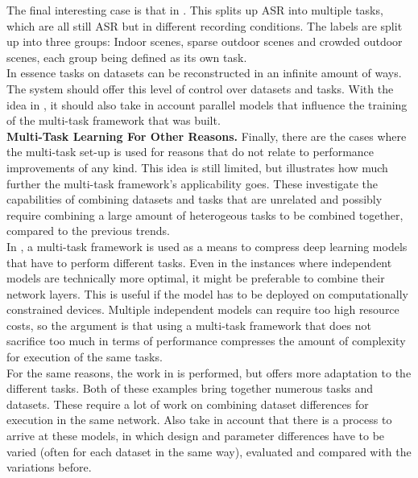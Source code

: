 The final interesting case is that in \cite{nwe2017convolutional}. This splits up ASR into multiple tasks, which are all still ASR but in different recording conditions. The labels are split up into three groups: Indoor scenes, sparse outdoor scenes and crowded outdoor scenes, each group being defined as its own task. \\

In essence tasks on datasets can be reconstructed in an infinite amount of ways. The system should offer this level of control over datasets and tasks. With the idea in \cite{huang2020guided}, it should also take in account parallel models that influence the training of the multi-task framework that was built.\\


\textbf{Multi-Task Learning For Other Reasons.} Finally, there are the cases where the multi-task set-up is used for reasons that do not relate to performance improvements of any kind. This idea is still limited, but illustrates how much further the multi-task framework's applicability goes. These investigate the capabilities of combining datasets and tasks that are unrelated and possibly require combining a large amount of heterogeous tasks to be combined together, compared to the previous trends.\\

In \cite{georgiev2017heterogeneous}, a multi-task framework is used as a means to compress deep learning models that have to perform different tasks. Even in the instances where independent models are technically more optimal, it might be preferable to combine their network layers. This is useful if the model has to be deployed on computationally constrained devices. Multiple independent models can require too high resource costs, so the argument is that using a multi-task framework that does not sacrifice too much in terms of performance compresses the amount of complexity for execution of the same tasks.\\

For the same reasons, the work in \cite{tagliasacchi2020multi} is performed, but offers more adaptation to the different tasks. Both of these examples bring together numerous tasks and datasets. These require a lot of work on combining dataset differences for execution in the same network. Also take in account that there is a process to arrive at these models, in which design and parameter differences have to be varied (often for each dataset in the same way), evaluated and compared with the variations before. \\

